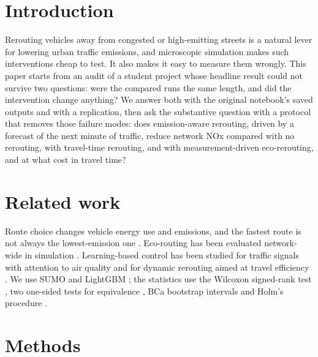 \documentclass[11pt]{article}
\begin{document}
\section{Introduction}
Rerouting vehicles away from congested or high-emitting streets is a natural lever for lowering urban traffic
emissions, and microscopic simulation makes such interventions cheap to test. It also makes it easy to measure
them wrongly. This paper starts from an audit of a student project whose headline result could not survive two
questions: were the compared runs the same length, and did the intervention change anything? We answer both with
the original notebook's saved outputs and with a replication, then ask the substantive question with a protocol
that removes those failure modes: does emission-aware rerouting, driven by a forecast of the next minute of
traffic, reduce network NOx compared with no rerouting, with travel-time rerouting, and with measurement-driven
eco-rerouting, and at what cost in travel time?

\section{Related work}
Route choice changes vehicle energy use and emissions, and the fastest route is not always the lowest-emission one
\citep{ahn2008route}. Eco-routing has been evaluated network-wide in simulation \citep{ahn2013ecorouting}.
Learning-based control has been studied for traffic signals with attention to air quality
\citep{fazzini2022signals,haydari2021signals} and for dynamic rerouting aimed at travel efficiency
\citep{du2021rerouting}. We use SUMO \citep{lopez2018sumo} and LightGBM \citep{ke2017lightgbm}; the statistics
use the Wilcoxon signed-rank test \citep{wilcoxon1945}, two one-sided tests for equivalence
\citep{schuirmann1987tost}, BCa bootstrap intervals \citep{efron1987bca} and Holm's procedure \citep{holm1979}.

\section{Methods}
\end{document}
